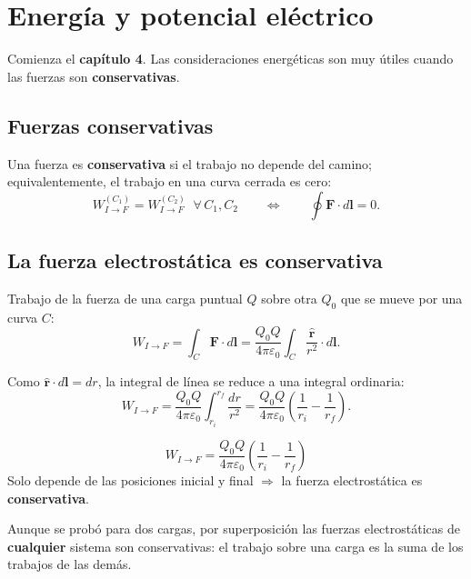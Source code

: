 \documentclass[12pt,a4paper]{article}
\begin{document}
\section{Energía y potencial eléctrico}

Comienza el \textbf{capítulo 4}. Las consideraciones energéticas son
muy útiles cuando las fuerzas son \textbf{conservativas}.

\subsection{Fuerzas conservativas}

Una fuerza es \textbf{conservativa} si el trabajo no depende del camino;
equivalentemente, el trabajo en una curva cerrada es cero:
\[
W_{I\to F}^{(C_1)} = W_{I\to F}^{(C_2)} \;\;\forall\, C_1,C_2
\qquad\Longleftrightarrow\qquad
\oint \mathbf{F}\cdot d\mathbf{l} = 0 .
\]

\subsection{La fuerza electrostática es conservativa}

Trabajo de la fuerza de una carga puntual $Q$ sobre otra $Q_0$ que se
mueve por una curva $C$:
\[
W_{I\to F} = \int_C \mathbf{F}\cdot d\mathbf{l}
= \frac{Q_0 Q}{4\pi\varepsilon_0}\int_C \frac{\hat{\mathbf{r}}}{r^2}\cdot d\mathbf{l} .
\]

Como $\hat{\mathbf{r}}\cdot d\mathbf{l} = dr$, la integral de línea se
reduce a una integral ordinaria:
\[
W_{I\to F} = \frac{Q_0 Q}{4\pi\varepsilon_0}\int_{r_i}^{r_f}\frac{dr}{r^2}
= \frac{Q_0 Q}{4\pi\varepsilon_0}\left(\frac{1}{r_i}-\frac{1}{r_f}\right).
\]

\begin{keybox}
  \[
  \boxed{W_{I\to F}
    = \frac{Q_0 Q}{4\pi\varepsilon_0}\left(\frac{1}{r_i}-\frac{1}{r_f}\right)}
  \]
  Solo depende de las posiciones inicial y final $\Rightarrow$ la fuerza
  electrostática es \textbf{conservativa}.
\end{keybox}

\begin{notebox}
  Aunque se probó para dos cargas, por superposición las fuerzas
  electrostáticas de \textbf{cualquier} sistema son conservativas: el
  trabajo sobre una carga es la suma de los trabajos de las demás.
\end{notebox}
\end{document}
